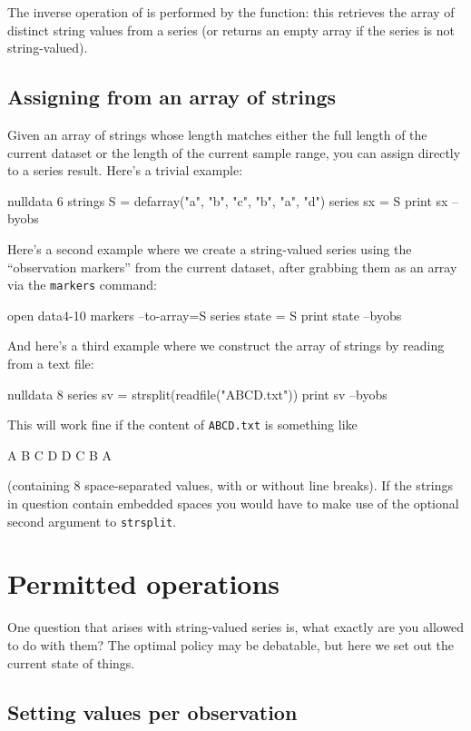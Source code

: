 The inverse operation of  is performed by the
 function: this retrieves the array of distinct string
values from a series (or returns an empty array if the series is not
string-valued).

\subsection{Assigning from an array of strings}
\label{sec:array-assign}

Given an array of strings whose length matches either the full length
of the current dataset or the length of the current sample range, you
can assign directly to a series result. Here's a trivial example:
\begin{code}
nulldata 6
strings S = defarray("a", "b", "c", "b", "a", "d")
series sx = S
print sx --byobs
\end{code}
Here's a second example where we create a string-valued series
using the ``observation markers'' from the current dataset, after
grabbing them as an array via the \texttt{markers} command:
\begin{code}
open data4-10
markers --to-array=S
series state = S
print state --byobs
\end{code}
And here's a third example where we construct the array of strings by
reading from a text file:
\begin{code}
nulldata 8
series sv = strsplit(readfile("ABCD.txt"))
print sv --byobs
\end{code}
This will work fine if the content of \texttt{ABCD.txt} is something
like
\begin{code}
A B C D D C B A
\end{code}
(containing 8 space-separated values, with or without line breaks). If
the strings in question contain embedded spaces you would have to make
use of the optional second argument to \texttt{strsplit}.

\section{Permitted operations}

One question that arises with string-valued series is, what exactly
are you allowed to do with them? The optimal policy may be debatable,
but here we set out the current state of things.

\subsection{Setting values per observation}

